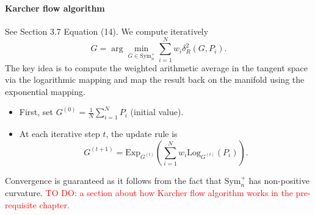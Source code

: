 \documentclass[10pt,a4paper]{book}
\theoremstyle{definition}
\theoremstyle{plain}
\theoremstyle{remark}
\begin{document}
\paragraph{Karcher flow algorithm} See \cite{pennec2006riemannian} Section 3.7 Equation (14). We compute iteratively
$$G=\arg \min_{G\in \text{Sym}_n^{+}}\sum_{i=1}^{N}w_i\delta_R^{2}(G,P_i).$$
The key idea is to compute the weighted arithmetic average in the tangent space via the logarithmic mapping and map the result back on the manifold using the exponential mapping.
\begin{itemize}
\item First, set $G^{(0)}=\frac{1}{N}\sum_{i=1}^{N}P_i$ (initial value). 
\item At each iterative step $t$, the update rule is
$$G^{(t+1)}=\text{Exp}_{G^{(t)}}\left(\sum_{i=1}^{N}w_i\text{Log}_{G^{(t)}}(P_i)\right).$$
\end{itemize}
Convergence is guaranteed as it follows from the fact that $\text{Sym}_{n}^{+}$ has non-positive curvature. 
\textcolor{red}{TO DO: a section about how Karcher flow algorithm works in the pre-requisite chapter.}
\end{document}

